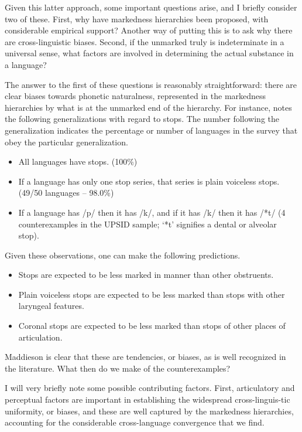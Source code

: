 \documentclass[output=paper]{langsci/langscibook}
\begin{document}
Given this latter approach, some important questions arise, and I briefly consider two of these. First, why have markedness hierarchies been proposed, with considerable empirical support? Another way of putting this is to ask why there are cross-linguistic biases. Second, if the unmarked truly is indeterminate in a universal sense, what factors are involved in determining the actual substance in a language?

\largerpage
{}  The answer to the first of these questions is reasonably straightforward: there are clear biases towards phonetic naturalness, represented in the markedness hierarchies by what is at the unmarked end of the hierarchy. For instance, \citet[39-40]{Maddieson1984} notes the following generalizations with regard to stops. The number following the generalization indicates the percentage or number of languages in the survey that obey the particular generalization.

\begin{itemize}
 \item All languages have stops. (100\%)
 \item If a language has only one stop series, that series is plain voiceless stops. (49/50 languages – 98.0\%)
 \item If a language has /p/ then it has /k/, and if it has /k/ then it has /*t/ (4 counterexamples in the UPSID sample; ‘*t’ signifies a dental or alveolar stop). 
\end{itemize}

Given these observations, one can make the following predictions.

\begin{itemize}
 \item Stops are expected to be less marked in manner than other obstruents.
 \item Plain voiceless stops are expected to be less marked than stops with other laryngeal features.
 \item Coronal stops are expected to be less marked than stops of other places of articulation.
\end{itemize}

Maddieson is clear that these are tendencies, or biases, as is well recognized in the literature. What then do we make of the counterexamples? 

I will very briefly note some possible contributing factors. First, articulatory and perceptual factors are important in establishing the widespread cross-linguis-tic uniformity, or biases, and these are well captured by the markedness hierarchies, accounting for the considerable cross-language convergence that we find. 
\end{document}
